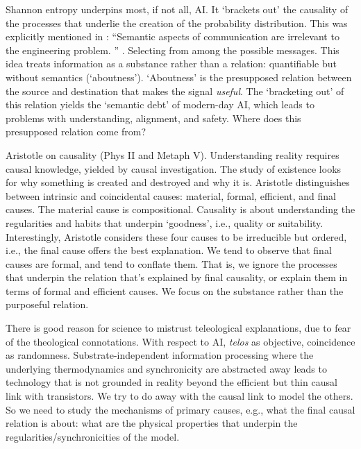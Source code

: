 \begin{affils}
\end{affils}

Shannon entropy underpins most, if not all, AI.
It `brackets out' the causality of the processes that underlie the creation of the
probability distribution.
This was explicitly mentioned in : ``Semantic aspects of
communication are irrelevant to the engineering problem.
'' \parencite*{Shannon1948}.
Selecting from among the possible messages.
This idea treats information as a substance rather than a relation: quantifiable but
without semantics (`aboutness').
`Aboutness' is the presupposed relation between the source and destination that makes the
signal \emph{useful}.
The `bracketing out' of this relation yields the `semantic debt' of modern-day AI,
which leads to problems with understanding, alignment, and safety.
Where does this presupposed relation come from?

Aristotle on causality (Phys II and Metaph V).
Understanding reality requires causal knowledge, yielded by causal investigation.
The study of existence looks for why something is created and destroyed and why it is.
Aristotle distinguishes between intrinsic and coincidental causes: material, formal,
efficient, and final causes.
The material cause is compositional.
Causality is about understanding the regularities and habits that underpin `goodness',
i.e., quality or suitability.
Interestingly, Aristotle considers these four causes to be irreducible but ordered,
i.e., the final cause offers the best explanation.
We tend to observe that final causes are formal, and tend to conflate them.
That is, we ignore the processes that underpin the relation that's explained by final
causality, or explain them in terms of formal and efficient causes.
We focus on the substance rather than the purposeful relation.

There is good reason for science to mistrust teleological explanations, due to fear of
the theological connotations.
With respect to AI, \emph{telos} as objective, coincidence as randomness.
Substrate-independent information processing where the underlying thermodynamics and
synchronicity are abstracted away leads to technology that is not grounded in reality
beyond the efficient but thin causal link with transistors.
We try to do away with the causal link to model the others.
So we need to study the mechanisms of primary causes, e.g., what the final causal
relation is about: what are the physical properties that underpin the
regularities/synchronicities of the model.


